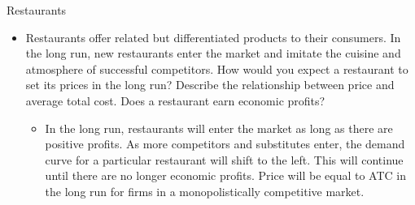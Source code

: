 \documentclass{beamer}
\begin{document}
\begin{frame}{Restaurants}
    \begin{itemize}
        \item Restaurants offer related but differentiated products to their consumers. In the long run, new restaurants enter the market and imitate the cuisine and atmosphere of successful competitors. How would you expect a restaurant to set its prices in the long run? Describe the relationship between price and average total cost. Does a restaurant earn economic profits?
        \begin{itemize}
            \item In the long run, restaurants will enter the market as long as there are positive profits. As more competitors and substitutes enter, the demand curve for a particular restaurant will shift to the left. This will continue until there are no longer economic profits. Price will be equal to ATC in the long run for firms in a monopolistically competitive market.
        \end{itemize}
    \end{itemize}
\end{frame}
\end{document}
